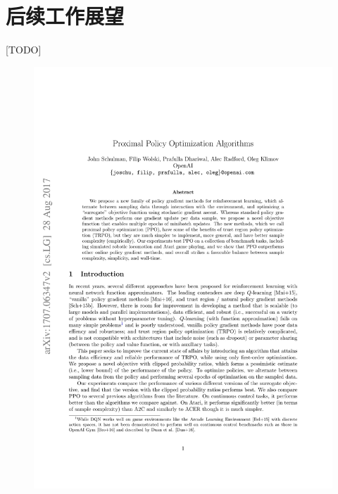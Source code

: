 \documentclass[bachelor]{thesis-uestc}
\begin{document}
	\section{后续工作展望}
	[TODO]
	
	\thesisacknowledgement
	[TODO]
	
	
	
	
	\thesisappendix
	
	\thesistranslationoriginal

	\begin{figure}[h]
		\includegraphics[width=13cm]{./pic/ProximalPolicyOptimizationAlgorithms-01.jpg}
	\end{figure}
\end{document}
